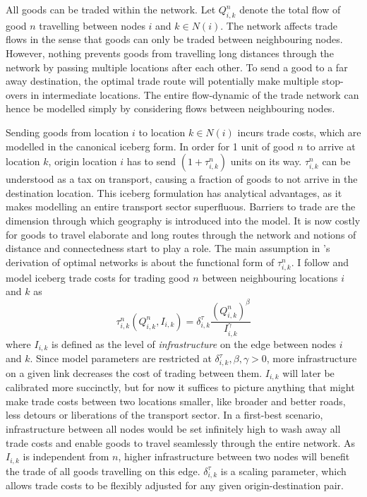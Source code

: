 \documentclass[11pt, oneside]{article}   	%
\begin{document}
All goods can be traded within the network. Let $Q_{i,k}^{n}$ denote the total flow of good $n$ travelling between nodes $i$ and $k \in N(i)$. The network affects trade flows in the sense that goods can only be traded between neighbouring nodes. However, nothing prevents goods from travelling long distances through the network by passing multiple locations after each other. To send a good to a far away destination, the optimal trade route will potentially make multiple stop-overs in intermediate locations. The entire flow-dynamic of the trade network can hence be modelled simply by considering flows between neighbouring nodes.

Sending goods from location $i$ to location $k \in N(i)$ incurs trade costs, which are modelled in the canonical iceberg form. In order for 1 unit of good $n$ to arrive at location $k$, origin location $i$ has to send $(1+\tau_{i,k}^{n})$ units on its way. $\tau_{i,k}^{n}$ can be understood as a tax on transport, causing a fraction of goods to not arrive in the destination location. This iceberg formulation has analytical advantages, as it makes modelling an entire transport sector superfluous. Barriers to trade are the dimension through which geography is introduced into the model. It is now costly for goods to travel elaborate and long routes through the network and notions of distance and connectedness start to play a role. The main assumption in \citeauthor{Fajgelbaum_OptimalTransportNetworks_2017}'s derivation of optimal networks is about the functional form of $\tau_{i,k}^{n}$. I follow \citeauthor{Fajgelbaum_OptimalTransportNetworks_2017} and model iceberg trade costs for trading good $n$ between neighbouring locations $i$ and $k$ as
\begin{equation}
  \tau_{i,k}^{n}(Q_{i,k}^{n}, I_{i,k}) = \delta^{\tau}_{i,k} \frac{(Q_{i,k}^{n})^{\beta}}{I_{i,k}^{\gamma}}
  \label{eq:tau}
\end{equation}
where $I_{i,k}$ is defined as the level of \emph{infrastructure} on the edge between nodes $i$ and $k$. Since model parameters are restricted at $\delta^{\tau}_{i,k}, \beta, \gamma >0$, more infrastructure on a given link decreases the cost of trading between them. $I_{i,k}$ will later be calibrated more succinctly, but for now it suffices to picture anything that might make trade costs between two locations smaller, like broader and better roads, less detours or liberations of the transport sector. In a first-best scenario, infrastructure between all nodes would be set infinitely high to wash away all trade costs and enable goods to travel seamlessly through the entire network. As $I_{i,k}$ is independent from $n$, higher infrastructure between two nodes will benefit the trade of all goods travelling on this edge. $\delta^{\tau}_{i,k}$ is a scaling parameter, which allows trade costs to be flexibly adjusted for any given origin-destination pair.
\end{document}
